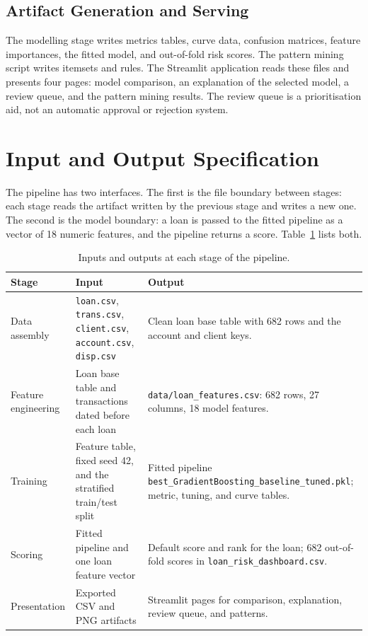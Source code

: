 \subsection{Artifact Generation and Serving}
The modelling stage writes metrics tables, curve data, confusion matrices, feature importances, the fitted model, and out-of-fold risk scores. The pattern mining script writes itemsets and rules. The Streamlit application reads these files and presents four pages: model comparison, an explanation of the selected model, a review queue, and the pattern mining results. The review queue is a prioritisation aid, not an automatic approval or rejection system.

\section{Input and Output Specification}
\label{sec:io}

The pipeline has two interfaces. The first is the file boundary between stages: each stage reads the artifact written by the previous stage and writes a new one. The second is the model boundary: a loan is passed to the fitted pipeline as a vector of 18 numeric features, and the pipeline returns a score. Table~\ref{tab:io} lists both.

\begin{table}[H]
    \centering
    \caption{Inputs and outputs at each stage of the pipeline.}
    \label{tab:io}
    \small
    \begin{tabularx}{\textwidth}{@{}>{\raggedright\arraybackslash}p{2.8cm} X X@{}}
        \toprule
        \textbf{Stage} & \textbf{Input} & \textbf{Output} \\
        \midrule
        Data assembly & \texttt{loan.csv}, \texttt{trans.csv}, \texttt{client.csv}, \texttt{account.csv}, \texttt{disp.csv} & Clean loan base table with 682 rows and the account and client keys. \\
        \addlinespace
        Feature engineering & Loan base table and transactions dated before each loan & \texttt{data/loan\_features.csv}: 682 rows, 27 columns, 18 model features. \\
        \addlinespace
        Training & Feature table, fixed seed 42, and the stratified train/test split & Fitted pipeline \texttt{best\_GradientBoosting\_baseline\_tuned.pkl}; metric, tuning, and curve tables. \\
        \addlinespace
        Scoring & Fitted pipeline and one loan feature vector & Default score and rank for the loan; 682 out-of-fold scores in \texttt{loan\_risk\_dashboard.csv}. \\
        \addlinespace
        Presentation & Exported CSV and PNG artifacts & Streamlit pages for comparison, explanation, review queue, and patterns. \\
        \bottomrule
    \end{tabularx}
\end{table}

